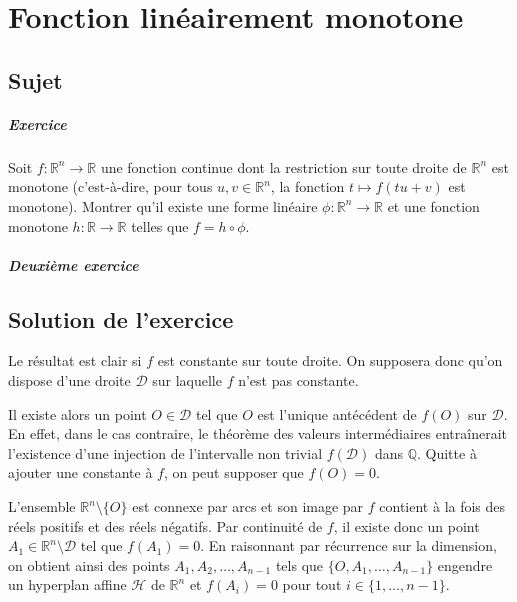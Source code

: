 \chapter{Fonction linéairement monotone} 

\section{Sujet}

\paragraph{Exercice}
Soit $f : \mathbb R^n \to \mathbb R$ une fonction continue dont la restriction sur toute droite de $\mathbb R^n$ est monotone (c'est-à-dire, pour tous $u,v \in \mathbb R^n$, la fonction $t\mapsto f(tu+v)$ est monotone).
Montrer qu'il existe une forme linéaire $\phi : \mathbb R^n \to \mathbb R$ et une fonction monotone $h : \mathbb R \to \mathbb R$ telles que $f = h \circ \phi$.

\paragraph{Deuxième exercice}

\section{Solution de l'exercice}

Le résultat est clair si $f$ est constante sur toute droite.
On supposera donc qu'on dispose d'une droite $\mathcal D$ sur laquelle $f$ n'est pas constante.

Il existe alors un point $O \in \mathcal D$ tel que $O$ est l'unique antécédent de $f(O)$ sur $\mathcal D$. En effet, dans le cas contraire, le théorème des valeurs intermédiaires entraînerait l'existence d'une injection de l'intervalle non trivial $f(\mathcal D)$ dans $\mathbb Q$.
Quitte à ajouter une constante à $f$, on peut supposer que $f(O)=0$.

L'ensemble $\mathbb R^n \setminus\{O\}$ est connexe par arcs et son image par $f$ contient à la fois des réels positifs et des réels négatifs.
Par continuité de $f$, il existe donc un point $A_1 \in \mathbb R^n \setminus \mathcal D$ tel que $f(A_1) = 0$.
En raisonnant par récurrence sur la dimension, on obtient ainsi des points $A_1,A_2,\dots,A_{n-1}$ tels que $\{O,A_1,\dots,A_{n-1}\}$ engendre un hyperplan affine $\mathcal H$ de $\mathbb R^n$ et $f(A_i) = 0$ pour tout $i\in \{1,\dots,n-1\}$.


